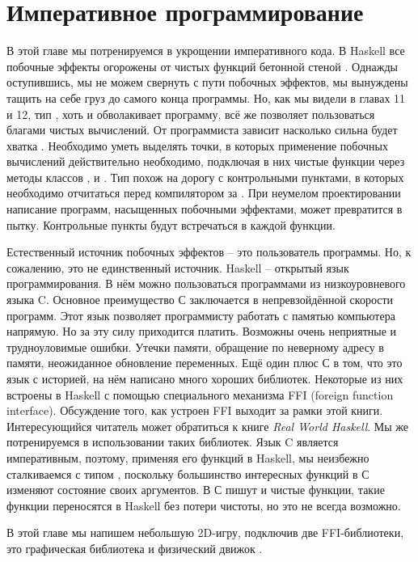 \setcounter{chapter}{18}
\chapter{Императивное программирование}

В этой главе мы потренируемся в укрощении императивного 
кода. В Haskell все побочные эффекты огорожены от
чистых функций бетонной стеной .
Однажды оступившись, мы не можем свернуть с пути побочных 
эффектов, мы вынуждены тащить на себе груз 
до самого конца программы. Но, как мы видели в главах 11 и 12,
тип  , хоть и обволакивает программу, всё же
позволяет пользоваться благами чистых вычислений.
От программиста зависит насколько сильна будет хватка .
Необходимо уметь выделять точки, в которых применение
побочных вычислений действительно необходимо, 
подключая в них чистые функции через методы классов 
,  и  .
Тип  похож на дорогу с контрольными пунктами, 
в которых необходимо отчитаться
перед компилятором за . При неумелом
проектировании написание программ, насыщенных
побочными эффектами, может превратится в пытку. 
Контрольные пункты будут встречаться в каждой функции.


Естественный источник побочных эффектов -- это пользователь программы.
Но, к сожалению, это не единственный источник. Haskell
-- открытый язык программирования. В нём можно пользоваться
программами из низкоуровневого языка C. Основное преимущество 
С заключается в непревзойдённой скорости программ. 
Этот язык позволяет программисту работать с памятью компьютера
напрямую. Но за эту силу приходится платить. 
Возможны очень неприятные и трудноуловимые ошибки. 
Утечки памяти, обращение по неверному адресу в памяти, 
неожиданное обновление переменных. Ещё один плюс С
в том, что это язык с историей, на нём написано много хороших
библиотек. Некоторые из них встроены в Haskell с помощью
специального механизма FFI (foreign function interface).
Обсуждение того, как устроен FFI выходит за рамки этой книги.
Интересующийся читатель может обратиться к книге 
\emph{Real World Haskell}. Мы же потренируемся в 
использовании таких библиотек. Язык C является императивным,
поэтому, применяя его функций в Haskell, мы неизбежно
сталкиваемся с типом , поскольку большинство
интересных функций в С изменяют состояние своих аргументов.
В С пишут и чистые функции, такие функции 
переносятся в Haskell без потери чистоты, но 
это не всегда возможно. 

В этой главе мы напишем небольшую 2D-игру, подключив
две FFI-библиотеки, это графическая библиотека 
и физический движок .

